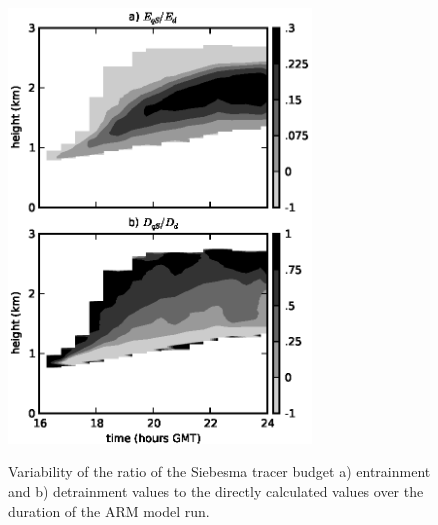 \documentclass[12pt]{article}
\begin{document}
\begin{figure}[t]
  \noindent\includegraphics[width=19pc]{./figures/entrainment_ratio_variability}\\
  \caption{Variability of the ratio of the Siebesma tracer budget a) entrainment
  and b) detrainment values to the directly calculated values over the duration
  of the ARM model run.}
  \label{fig:entrainment_ratio_variability}
\end{figure}
\end{document}
